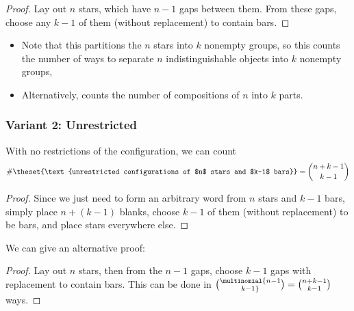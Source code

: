 \begin{proof}

Lay out \(n\) stars, which have \(n-1\) gaps between them. From these
gaps, choose any \(k-1\) of them (without replacement) to contain bars.

\end{proof}

\begin{itemize}
\tightlist
\item
  Note that this partitions the \(n\) stars into \(k\) nonempty groups,
  so this counts the number of ways to separate \(n\) indistinguishable
  objects into \(k\) nonempty groups,
\item
  Alternatively, counts the number of compositions of \(n\) into \(k\)
  parts.
\end{itemize}

\hypertarget{variant-2-unrestricted}{%
\subsubsection{Variant 2: Unrestricted}\label{variant-2-unrestricted}}

\begin{proposition}[?]

With no restrictions of the configuration, we can count
\begin{align*}
\#\theset{\text{unrestricted configurations of $n$ stars and $k-1$ bars}} = {n+k-1 \choose k-1}
\end{align*}

\end{proposition}

\begin{proof}

Since we just need to form an arbitrary word from \(n\) stars and
\(k-1\) bars, simply place \(n + (k-1)\) blanks, choose \(k-1\) of them
(without replacement) to be bars, and place stars everywhere else.

\end{proof}

We can give an alternative proof:

\begin{proof}

Lay out \(n\) stars, then from the \(n-1\) gaps, choose \(k-1\) gaps
with replacement to contain bars. This can be done in
\(\multinomial{n-1 \choose k-1} = {n+k-1 \choose k-1}\) ways.

\end{proof}

